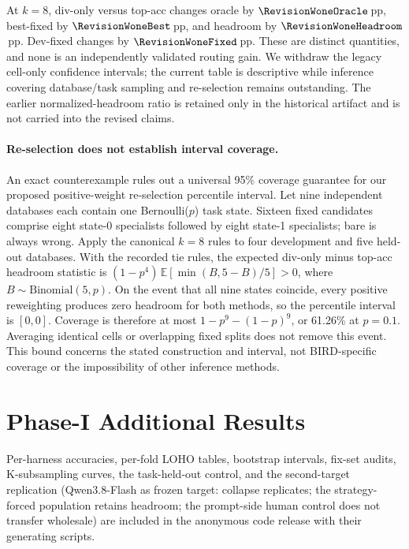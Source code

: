 At $k=8$, div-only versus top-acc changes oracle by
$\RevisionWoneOracle$\,pp, best-fixed by $\RevisionWoneBest$\,pp,
and headroom by $\RevisionWoneHeadroom$\,pp. Dev-fixed changes by
$\RevisionWoneFixed$\,pp. These are distinct quantities, and none is an
independently validated routing gain. We withdraw the legacy cell-only
confidence intervals; the current table is descriptive while inference
covering database/task sampling and re-selection remains outstanding.
The earlier normalized-headroom ratio is retained only in the historical
artifact and is not carried into the revised claims.

\begin{table}[t]
\centering\small

\caption{Canonical descriptive W1 reanalysis. Every pool contains $k$
selected candidates plus the common bare. Means over 18 cells and 100
overlapping database splits; no confidence intervals. Dev-fixed is chosen
only on development data; Best uses held-out outcomes.}
\label{tab:selection}
\end{table}

\paragraph{Re-selection does not establish interval coverage.}
An exact counterexample rules out a universal 95\% coverage guarantee for
our proposed positive-weight re-selection percentile interval. Let nine
independent databases each contain one Bernoulli($p$) task state. Sixteen
fixed candidates comprise eight state-0 specialists followed by eight
state-1 specialists; bare is always wrong. Apply the canonical $k=8$
rules to four development and five held-out databases. With the recorded
tie rules, the expected div-only minus top-acc headroom statistic is
$(1-p^4)\,\mathbb{E}[\min(B,5-B)/5]>0$, where $B\sim\mathrm{Binomial}(5,p)$.
On the event that all nine states coincide, every positive reweighting
produces zero headroom for both methods, so the percentile interval is
$[0,0]$. Coverage is therefore at most $1-p^9-(1-p)^9$, or 61.26\% at
$p=0.1$. Averaging identical cells or overlapping fixed splits does not
remove this event. This bound concerns the stated construction and
interval, not BIRD-specific coverage or the impossibility of other
inference methods.

\section{Phase-I Additional Results}\label{app:phase1-results}
Per-harness accuracies, per-fold LOHO tables, bootstrap intervals,
fix-set audits, K-subsampling curves, the task-held-out control, and the
second-target replication (Qwen3.8-Flash as frozen target: collapse
replicates; the strategy-forced population retains headroom; the
prompt-side human control does not transfer wholesale) are included in
the anonymous code release with their generating scripts.

